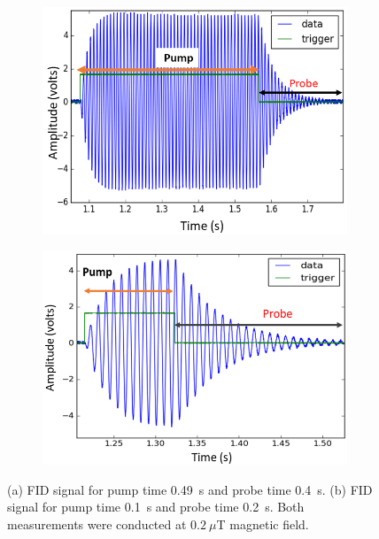 \begin{figure}
\centering
\begin{subfigure}[b]{0.7\textwidth}
  \centering
  \includegraphics[width=\textwidth]{figures/FID_.png}
  \caption{}
  \label{fig:pump-long}
\end{subfigure}
\hfill
\begin{subfigure}[b]{0.7\textwidth}
  \centering
  \includegraphics[width=\textwidth]{figures/Capture.png}
  \caption{}
  \label{fig:pump-short}
\end{subfigure}
\caption{(a) FID signal for pump time 0.49~s and probe time 0.4~s. (b)
  FID signal for pump time 0.1~s and probe time 0.2~s.  Both
  measurements were conducted at $0.2~\mu$T magnetic field.}
    \label{fig:pump-time}
\end{figure} 


